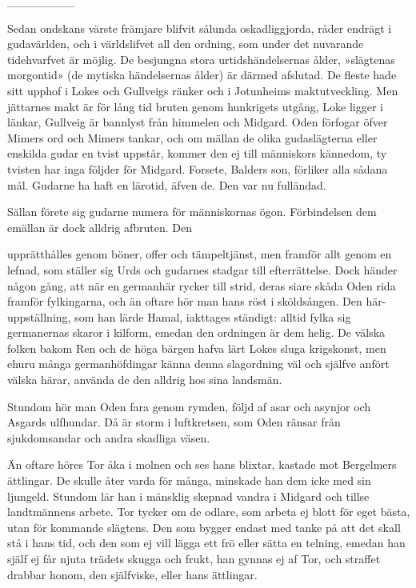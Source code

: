 {\_\_\_\_\_\_\_\_}

Sedan ondskans värste främjare blifvit sålunda oskadliggjorda, råder
endrägt i gudavärlden, och i världslifvet all den ordning, som under det
nuvarande tidehvarfvet är möjlig. De besjungna stora urtidshändelsernas
ålder, »slägtenas morgontid» (de mytiska händelsernas ålder) är därmed
afslutad. De fleste hade sitt upphof i Lokes och Gullveigs ränker och i
Jotunheims maktutveckling. Men jättarnes makt är för lång tid bruten
genom hunkrigets utgång, Loke ligger i länkar, Gullveig är bannlyst från
himmelen och Midgard. Oden förfogar öfver Mimers ord och Mimers tankar,
och om mällan de olika gudaslägterna eller enskilda gudar en tvist
uppstår, kommer den ej till människors kännedom, ty tvisten har inga
följder för Midgard. Forsete, Balders son, förliker alla sådana mål.
Gudarne ha haft en lärotid, äfven de. Den var nu fulländad.

Sällan förete sig gudarne numera för människornas ögon. Förbindelsen dem
emällan är dock alldrig afbruten. Den

upprätthålles genom böner, offer och tämpeltjänst, men framför allt
genom en lefnad, som ställer sig Urds och gudarnes stadgar till
efterrättelse. Dock händer någon gång, att när en germanhär rycker till
strid, deras siare skåda Oden rida framför fylkingarna, och än oftare
hör man hans röst i sköldsången. Den här-uppställning, som han lärde
Hamal, iakttages ständigt: alltid fylka sig germanernas skaror i
kilform, emedan den ordningen är dem helig. De välska folken bakom Ren
och de höga bärgen hafva lärt Lokes sluga krigskonst, men ehuru många
germanhöfdingar känna denna slagordning väl och själfve anfört välska
härar, använda de den alldrig hos sina landsmän.

Stundom hör man Oden fara genom rymden, följd af asar och asynjor och
Asgards ulfhundar. Då är storm i luftkretsen, som Oden ränsar från
sjukdomsandar och andra skadliga väsen.

Än oftare höres Tor åka i molnen och ses hans blixtar, kastade mot
Bergelmers ättlingar. De skulle åter varda för många, minskade han dem
icke med sin ljungeld. Stundom lär han i mänsklig skepnad vandra i
Midgard och tillse landtmännens arbete. Tor tycker om de odlare, som
arbeta ej blott för eget bästa, utan för kommande slägtens. Den som
bygger endast med tanke på att det skall stå i hans tid, och den som ej
vill lägga ett frö eller sätta en telning, emedan han själf ej får njuta
trädets skugga och frukt, han gynnas ej af Tor, och straffet drabbar
honom, den själfviske, eller hans ättlingar.

